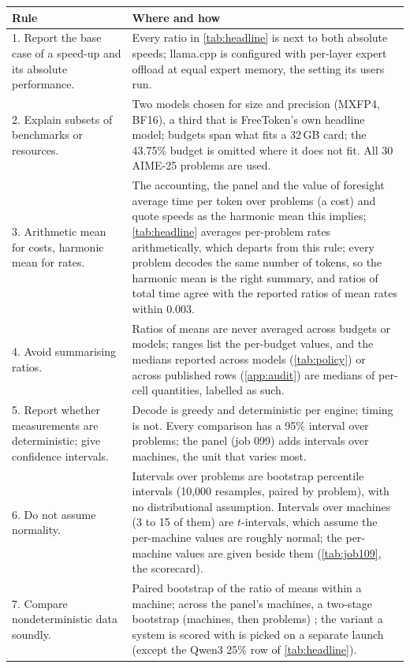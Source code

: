 \begin{longtable}{p{}p{}}\toprule
Rule & Where and how \\\midrule\endhead
1. Report the base case of a speed-up and its absolute performance. & Every ratio in \cref{tab:headline} is next to both absolute speeds; llama.cpp is configured with per-layer expert offload at equal expert memory, the setting its users run. \\
2. Explain subsets of benchmarks or resources. & Two models chosen for size and precision (MXFP4, BF16), a third that is FreeToken's own headline model; budgets span what fits a 32\,GB card; the 43.75\% budget is omitted where it does not fit. All 30 AIME-25 problems are used. \\
3. Arithmetic mean for costs, harmonic mean for rates. & The accounting, the panel and the value of foresight average time per token over problems (a cost) and quote speeds as the harmonic mean this implies; \cref{tab:headline} averages per-problem rates arithmetically, which departs from this rule; every problem decodes the same number of tokens, so the harmonic mean is the right summary, and ratios of total time agree with the reported ratios of mean rates within 0.003. \\
4. Avoid summarising ratios. & Ratios of means are never averaged across budgets or models; ranges list the per-budget values, and the medians reported across models (\cref{tab:policy}) or across published rows (\cref{app:audit}) are medians of per-cell quantities, labelled as such. \\
5. Report whether measurements are deterministic; give confidence intervals. & Decode is greedy and deterministic per engine; timing is not. Every comparison has a 95\% interval over problems; the panel (job 099) adds intervals over machines, the unit that varies most. \\
6. Do not assume normality. & Intervals over problems are bootstrap percentile intervals (10{,}000 resamples, paired by problem), with no distributional assumption. Intervals over machines (3 to 15 of them) are $t$-intervals, which assume the per-machine values are roughly normal; the per-machine values are given beside them (\cref{tab:job109}, the scorecard). \\
7. Compare nondeterministic data soundly. & Paired bootstrap of the ratio of means within a machine; across the panel's machines, a two-stage bootstrap (machines, then problems) \citep{kalibera2013rigorous}; the variant a system is scored with is picked on a separate launch (except the Qwen3 25\% row of \cref{tab:headline}). \\

\end{longtable}
